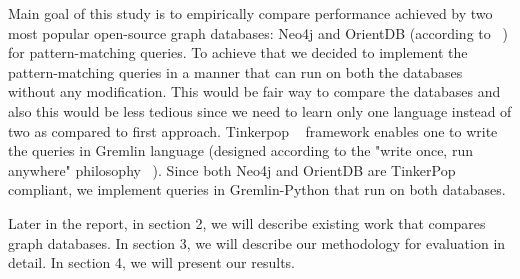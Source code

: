 Main goal of this study is to empirically compare performance achieved by two most popular open-source graph databases: Neo4j and OrientDB (according to ~\cite{dbranking}) for pattern-matching queries. To achieve that we decided to implement the pattern-matching queries in a manner that can  run on both the databases without any modification. This would be fair way to compare the databases and also this would be less tedious since we need to learn only one language instead of two as compared to first approach. Tinkerpop ~\cite{tinkerpop} framework enables one to write the queries in Gremlin language (designed according to the "write once, run anywhere" philosophy ~\cite{gremlin}). Since both Neo4j and OrientDB are TinkerPop compliant, we implement queries in Gremlin-Python that run on both databases. 


Later in the report, in section 2, we will describe existing work that compares graph databases. In section 3, we will describe our methodology for evaluation in detail. In section 4, we will present our results.   




